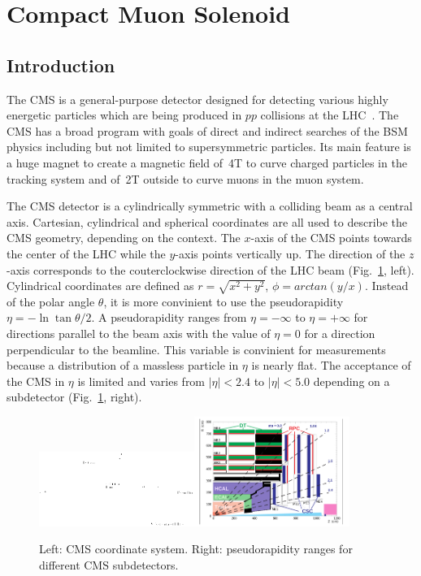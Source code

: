 \section{Compact Muon Solenoid}
\label{sec:Exp_CMS}
\subsection{Introduction}

The CMS is a general-purpose detector designed for detecting various highly energetic particles which are being produced in $pp$ collisions at the LHC~\cite{ref_CMS_TDR}. The CMS has a broad program with goals of direct and indirect searches of the BSM physics including but not limited to supersymmetric particles. Its main feature is a huge magnet to create a magnetic field of~4T to curve charged particles in the tracking system and of~2T outside to curve muons in the muon system.

The CMS detector is a cylindrically symmetric with a colliding beam as a central axis. Cartesian, cylindrical and spherical coordinates are all used to describe the CMS geometry, depending on the context. The $x$-axis of the CMS points towards the center of the LHC while the $y$-axis points vertically up. The direction of the $z$-axis corresponds to the couterclockwise direction of the LHC beam (Fig.~\ref{fig:CMScoord}, left). Cylindrical coordinates are defined as $r=\sqrt{x^2+y^2}$, $\phi=arctan(y/x)$. Instead of the polar angle $\theta$, it is more convinient to use the pseudorapidity $\eta=-\ln{\tan{\theta/2}}$. A pseudorapidity ranges from $\eta=-\infty$ to $\eta=+\infty$ for directions parallel to the beam axis with the value of $\eta=0$ for a direction perpendicular to the beamline. This variable is convinient for measurements because a distribution of a massless particle in $\eta$ is nearly flat. The acceptance of the CMS in $\eta$ is limited and varies from $|\eta|<2.4$ to $|\eta|<5.0$ depending on a subdetector (Fig.~\ref{fig:CMScoord}, right).   

\begin{figure}[htb]
  \begin{center}
    {\includegraphics[width=0.45\textwidth]{../figs/Exp/CMScoord.png}\includegraphics[width=0.45\textwidth]{../figs/Exp/CMScoord_eta.png}}
    \caption{Left: CMS coordinate system. Right: pseudorapidity ranges for different CMS subdetectors.}
    \label{fig:CMScoord}
  \end{center}
\end{figure}

